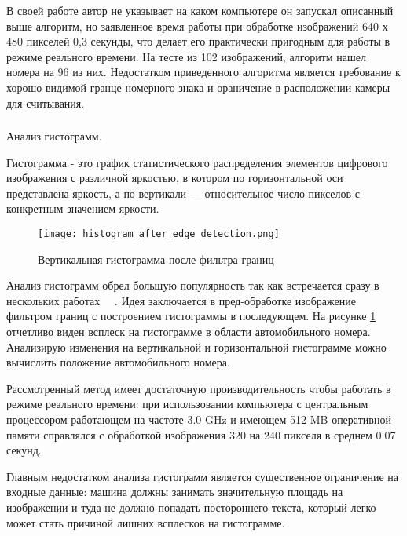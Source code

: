 В своей работе автор не указывает на каком компьютере он запускал описанный выше алгоритм, но заявленное время работы при обработке изображений 640 х 480 пикселей 0,3 секунды, что делает его практически пригодным для работы в режиме реального времени. На тесте из 102 изображений, алгоритм нашел номера на 96 из них. Недостатком приведенного алгоритма является требование к хорошо видимой гранце номерного знака и ораничение в расположении камеры для считывания.

\subsubsection{}
\label{sub:domain:search:histogram_analisys}
Анализ гистограмм.

Гистограмма - это график статистического распределения элементов цифрового изображения с различной яркостью, в котором по горизонтальной оси представлена яркость, а по вертикали — относительное число пикселов с конкретным значением яркости.~\cite{color_histogram}

\begin{figure}[ht]
\centering
    \texttt{[image: histogram\_after\_edge\_detection.png]}  
    \caption{Вертикальная гистограмма после фильтра границ}
    \label{fig:domain:search:edges_analisys:vertical_histogram_after_edge_detection}
\end{figure}

Анализ гистограмм обрел большую популярность так как встречается сразу в нескольких работах ~\cite{recognition_using_histogram_1}~\cite{recognition_using_histogram_2}. 
Идея заключается в пред-обработке изображение фильтром границ с построением гистограммы в последующем. На рисунке \ref{fig:domain:search:edges_analisys:vertical_histogram_after_edge_detection} отчетливо виден всплеск на гистограмме в области автомобильного номера. Анализирую изменения на вертикальной и горизонтальной гистограмме можно вычислить положение автомобильного номера. 

Рассмотренный метод имеет достаточную производительность чтобы работать в режиме реального времени: при использовании компьютера с центральным процессором работающем на частоте 3.0 GHz и имеющем 512 MB оперативной памяти справлялся с обработкой изображения 320 на 240 пикселя в среднем 0.07 секунд.

Главным недостатком анализа гистограмм является существенное ограничение на входные данные: машина должны занимать значительную площадь на изображении и туда не должно попадать постороннего текста, который легко может стать причиной лишних всплесков на гистограмме.

